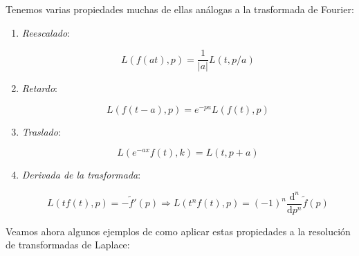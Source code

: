 \documentclass[12pt,a4paper]{book}
\newcommand{\D}{\mathrm{d}}
\begin{document}
Tenemos varias propiedades muchas de ellas análogas a la trasformada de Fourier:

\begin{enumerate}

\item \textit{Reescalado}:

$$ L(f(at),p) = \dfrac{1}{|a|} L(t,p/a) $$

\item \textit{Retardo}:

$$ L(f(t-a),p) = e^{-pa} L(f(t),p) $$

\item \textit{Traslado}:

$$ L(e^{-ax} f(t),k) = L(t,p+a) $$

\item \textit{Derivada de la trasformada}:

$$ L(t f(t), p) = - \tilde{f}'(p) \Longrightarrow L(t^n f(t), p) = (-1)^n \dfrac{\D^n}{\D p^n} \tilde{f} (p) $$

\end{enumerate}

Veamos ahora algunos ejemplos de como aplicar estas propiedades a la resolución de transformadas de Laplace:
\end{document}
